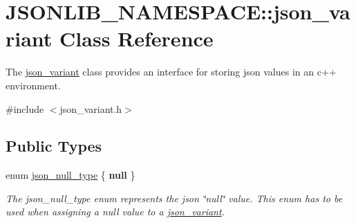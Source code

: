 \hypertarget{classJSONLIB__NAMESPACE_1_1json__variant}{}\section{J\+S\+O\+N\+L\+I\+B\+\_\+\+N\+A\+M\+E\+S\+P\+A\+CE\+:\+:json\+\_\+variant Class Reference}
\label{classJSONLIB__NAMESPACE_1_1json__variant}


The \hyperlink{classJSONLIB__NAMESPACE_1_1json__variant}{json\+\_\+variant} class provides an interface for storing json values in an c++ environment.  




{\ttfamily \#include $<$json\+\_\+variant.\+h$>$}

\subsection*{Public Types}
\begin{DoxyCompactItemize}
\item 
enum \hyperlink{classJSONLIB__NAMESPACE_1_1json__variant_a1251d2c28258eeebea991ed0b39c3e0c}{json\+\_\+null\+\_\+type} \{ {\bfseries null}
 \}\begin{DoxyCompactList}\small\item\em The json\+\_\+null\+\_\+type enum represents the json \char`\"{}null\char`\"{} value. This enum has to be used when assigning a null value to a \hyperlink{classJSONLIB__NAMESPACE_1_1json__variant}{json\+\_\+variant}. \end{DoxyCompactList}
\end{DoxyCompactItemize}
